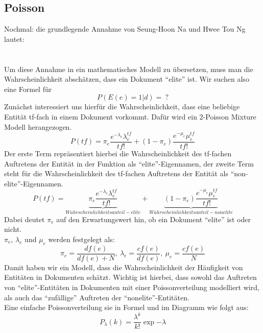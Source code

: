 \subsection{Poisson}
Nochmal: die grundlegende Annahme von Seung-Hoon Na und Hwee Tou Ng lautet:\\
\\
\\
Um diese Annahme in ein mathematisches Modell zu übersetzen, muss man die Wahrscheinlichkeit abschätzen, dass ein Dokument ``elite'' ist. Wir suchen also eine Formel für
\[P\left( E\left( e \right)=1|d \right)=\ ?\]
Zunächst interessiert uns hierfür die Wahrscheinlichkeit, dass eine beliebige Entität tf-fach in einem Dokument vorkommt. Dafür wird ein 2-Poisson Mixture Modell herangezogen.
\[P\left( tf \right)=\pi_e\frac{e^{-\lambda_e}\lambda_{e}^{ tf }}{tf!}+\left( 1-\pi_e \right)\frac{e^{-\mu_e} \mu_e^{tf}}{tf!}\]
Der erste Term repräsentiert hierbei die Wahrscheinlichkeit des tf-fachen Auftretens der Entität in der Funktion als ``elite''-Eigennamen, der zweite Term steht für die Wahrscheinlichkeit des tf-fachen Auftretens der Entität als ``non-elite''-Eigennamen.
\[P\left( tf \right)=\underbrace{\pi_e\frac{e^{-\lambda_e}\lambda_{e}^{ tf }}{tf!}}_{Wahrscheinlichkeitsanteil - elite} +\underbrace{\left( 1-\pi_e \right)\frac{e^{-\mu_e} \mu_e^{tf}}{tf!}}_{Wahrscheinlichkeitsanteil - nonelite}\]
Dabei deutet $\pi_e$ auf den Erwartungswert hin, ob ein Dokument ``elite'' ist oder nicht.\\
$\pi_e$, $\lambda_e$ und $\mu_e$ werden festgelegt als:
\[\pi_e=\frac{df\left( e \right)}{df\left( e \right)+N}, \ \lambda_e=\frac{cf\left( e \right)}{df\left( e \right)}, \ \mu_e=\frac{cf(e)}{N}\]
Damit haben wir ein Modell, dass die Wahrscheinlichkeit der Häufigkeit von Entitäten in Dokumenten schätzt. Wichtig ist hierbei, dass sowohl das Auftreten von ``elite''-Entitäten in Dokumenten mit einer Poissonverteilung modelliert wird, als auch das ``zufällige'' Auftreten der ``nonelite''-Entitäten.\\
Eine einfache Poissonverteilung sie in Formel und im Diagramm wie folgt aus:
\[P_\lambda(k)=\frac{\lambda^k}{k!}\exp{-\lambda}\]
